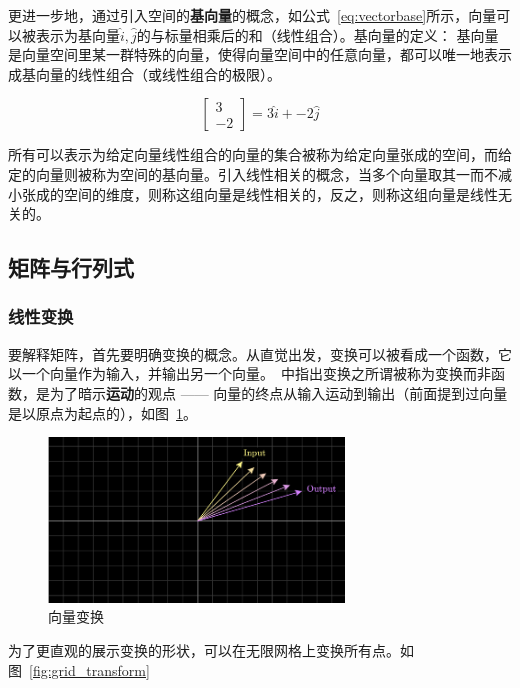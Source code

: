 \documentclass[UTF8]{ctexart}
\begin{document}
更进一步地，通过引入空间的\textbf{基向量}的概念，如公式~\ref{eq:vectorbase}所示，向量可以被表示为基向量$\hat{i}, \hat{j}$的与标量相乘后的和（线性组合）。基向量的定义： 基向量是向量空间里某一群特殊的向量，使得向量空间中的任意向量，都可以唯一地表示成基向量的线性组合（或线性组合的极限）。

\begin{equation}
    \label{eq:vectorbase}
    \begin{bmatrix}
        3 \\ -2
    \end{bmatrix} = 3\hat{i} + -2\hat{j}
\end{equation}

所有可以表示为给定向量线性组合的向量的集合被称为给定向量张成的空间，而给定的向量则被称为空间的基向量。引入线性相关的概念，当多个向量取其一而不减小张成的空间的维度，则称这组向量是线性相关的，反之，则称这组向量是线性无关的。

\subsection{矩阵与行列式}

\subsubsection{线性变换}
要解释矩阵，首先要明确变换的概念。从直觉出发，变换可以被看成一个函数，它以一个向量作为输入，并输出另一个向量。~\cite{Essenceoflinearalgebra}中指出变换之所谓被称为变换而非函数，是为了暗示\textbf{运动}的观点 —— 向量的终点从输入运动到输出（前面提到过向量是以原点为起点的），如图~\ref*{fig:vector_transform}。

\begin{figure}[hb]
    \centering
    \includegraphics[width=0.7\textwidth]{./figs/vector_transform.png}
    \caption{向量变换}
    \label{fig:vector_transform}
\end{figure}

为了更直观的展示变换的形状，可以在无限网格上变换所有点。如图~\ref*{fig:grid_transform}
\end{document}

